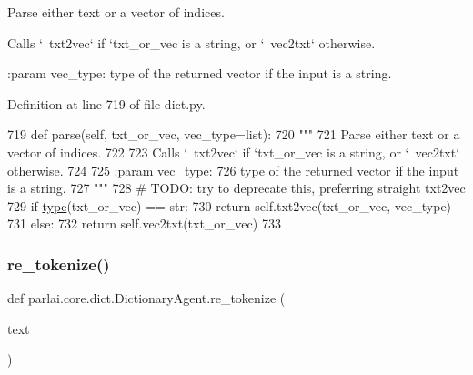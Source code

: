 \begin{DoxyVerb}Parse either text or a vector of indices.

Calls `~txt2vec` if `txt_or_vec is a string, or `~vec2txt` otherwise.

:param vec_type:
    type of the returned vector if the input is a string.
\end{DoxyVerb}
 

Definition at line 719 of file dict.\+py.


\begin{DoxyCode}
719     \textcolor{keyword}{def }parse(self, txt\_or\_vec, vec\_type=list):
720         \textcolor{stringliteral}{"""}
721 \textcolor{stringliteral}{        Parse either text or a vector of indices.}
722 \textcolor{stringliteral}{}
723 \textcolor{stringliteral}{        Calls `~txt2vec` if `txt\_or\_vec is a string, or `~vec2txt` otherwise.}
724 \textcolor{stringliteral}{}
725 \textcolor{stringliteral}{        :param vec\_type:}
726 \textcolor{stringliteral}{            type of the returned vector if the input is a string.}
727 \textcolor{stringliteral}{        """}
728         \textcolor{comment}{# TODO: try to deprecate this, preferring straight txt2vec}
729         \textcolor{keywordflow}{if} \hyperlink{namespaceparlai_1_1agents_1_1tfidf__retriever_1_1build__tfidf_ad5dfae268e23f506da084a9efb72f619}{type}(txt\_or\_vec) == str:
730             \textcolor{keywordflow}{return} self.txt2vec(txt\_or\_vec, vec\_type)
731         \textcolor{keywordflow}{else}:
732             \textcolor{keywordflow}{return} self.vec2txt(txt\_or\_vec)
733 
\end{DoxyCode}
\mbox{\label{classparlai_1_1core_1_1dict_1_1DictionaryAgent_a78edf54954bf0514e1798ce694a758fe}} 
\subsubsection{\texorpdfstring{re\+\_\+tokenize()}{re\_tokenize()}}
{\footnotesize\ttfamily def parlai.\+core.\+dict.\+Dictionary\+Agent.\+re\+\_\+tokenize (\begin{DoxyParamCaption}\item[{}]{text }\end{DoxyParamCaption})\hspace{0.3cm}{\ttfamily [static]}}

